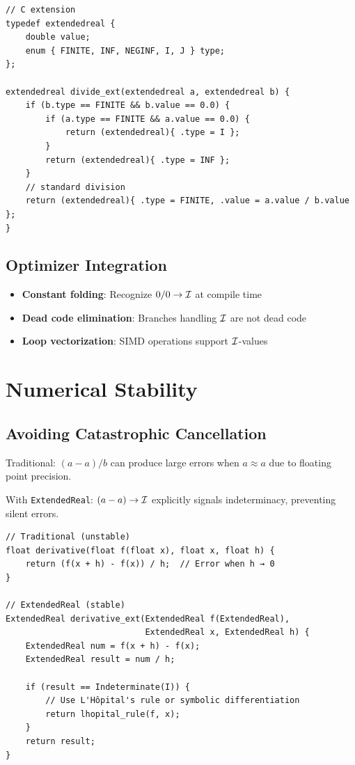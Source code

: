 \begin{verbatim}
// C extension
typedef extendedreal {
    double value;
    enum { FINITE, INF, NEGINF, I, J } type;
};

extendedreal divide_ext(extendedreal a, extendedreal b) {
    if (b.type == FINITE && b.value == 0.0) {
        if (a.type == FINITE && a.value == 0.0) {
            return (extendedreal){ .type = I };
        }
        return (extendedreal){ .type = INF };
    }
    // standard division
    return (extendedreal){ .type = FINITE, .value = a.value / b.value };
}
\end{verbatim}

\subsection{Optimizer Integration}

\begin{itemize}
    \item \textbf{Constant folding}: Recognize $0/0 \to \mathcal{I}$ at compile time
    \item \textbf{Dead code elimination}: Branches handling $\mathcal{I}$ are not dead code
    \item \textbf{Loop vectorization}: SIMD operations support $\mathcal{I}$-values
\end{itemize}

\section{Numerical Stability}

\subsection{Avoiding Catastrophic Cancellation}

Traditional: $(a - a) / b$ can produce large errors when $a \approx a$ due to floating point precision.

With \texttt{ExtendedReal}: $(a - a) \to \mathcal{I}$ explicitly signals indeterminacy, preventing silent errors.

\begin{example}
\begin{verbatim}
// Traditional (unstable)
float derivative(float f(float x), float x, float h) {
    return (f(x + h) - f(x)) / h;  // Error when h → 0
}

// ExtendedReal (stable)
ExtendedReal derivative_ext(ExtendedReal f(ExtendedReal), 
                            ExtendedReal x, ExtendedReal h) {
    ExtendedReal num = f(x + h) - f(x);
    ExtendedReal result = num / h;
    
    if (result == Indeterminate(I)) {
        // Use L'Hôpital's rule or symbolic differentiation
        return lhopital_rule(f, x);
    }
    return result;
}
\end{verbatim}
\end{example}

